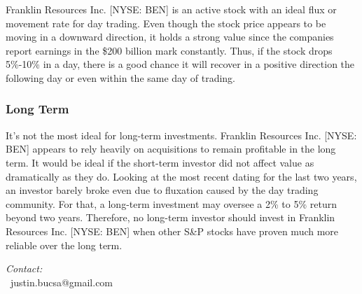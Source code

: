 \documentclass[9pt,a4paper,twoside]{tau}
\begin{document}
        Franklin Resources Inc. [NYSE: BEN] is an active stock with an ideal flux or movement rate for day trading. Even though the stock price appears to be moving in a downward direction, it holds a strong value since the companies report earnings in the \$200 billion mark constantly. Thus, if the stock drops 5\%-10\% in a day, there is a good chance it will recover in a positive direction the following day or even within the same day of trading.

    \subsubsection{Long Term}
    
        It's not the most ideal for long-term investments. Franklin Resources Inc. [NYSE: BEN] appears to rely heavily on acquisitions to remain profitable in the long term. It would be ideal if the short-term investor did not affect value as dramatically as they do. Looking at the most recent dating for the last two years, an investor barely broke even due to fluxation caused by the day trading community. For that, a long-term investment may oversee a 2\% to 5\% return beyond two years. Therefore, no long-term investor should invest in Franklin Resources Inc. [NYSE: BEN] when other S&P stocks have proven much more reliable over the long term.


\printbibliography



\begin{center}

	\textit{Contact:} \\

	\faEnvelope[regular]\ justin.bucsa@gmail.com \\

\end{center}

\end{document}
